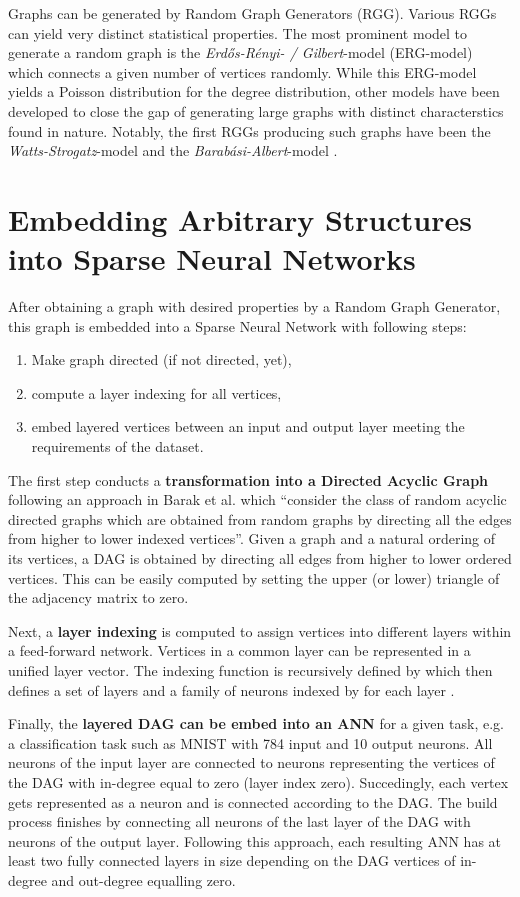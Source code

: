 \documentclass[runningheads]{llncs}
\begin{document}
Graphs can be generated by Random Graph Generators (RGG).
Various RGGs can yield very distinct statistical properties.
The most prominent model to generate a random graph is the \textit{Erdős-Rényi- / Gilbert}-model (ERG-model) which connects a given number of vertices randomly. While this ERG-model yields a Poisson distribution for the degree distribution, other models have been developed to close the gap of generating large graphs with distinct characterstics found in nature.
Notably, the first RGGs producing such graphs have been the \textit{Watts-Strogatz}-model \cite{watts1998collective} and the \textit{Barabási-Albert}-model \cite{albert2002statistical}.



\section{Embedding Arbitrary Structures into Sparse Neural Networks}
After obtaining a graph with desired properties by a Random Graph Generator, this graph is embedded into a Sparse Neural Network with following steps:
\begin{enumerate}
	\item Make graph directed (if not directed, yet),
	\item compute a layer indexing for all vertices,
	\item embed layered vertices between an input and output layer meeting the requirements of the dataset.
\end{enumerate}

\noindent The first step conducts a \textbf{transformation into a Directed Acyclic Graph} following an approach in Barak et al. \cite{barak1984maximal} which ``consider the class  of random acyclic directed graphs which are obtained from random graphs by directing all the edges from higher to lower indexed vertices''.
Given a graph and a natural ordering of its vertices, a DAG is obtained by directing all edges from higher to lower ordered vertices.
This can be easily computed by setting the upper (or lower) triangle of the adjacency matrix to zero.

\noindent Next, a \textbf{layer indexing} is computed to assign vertices into different layers within a feed-forward network.
Vertices in a common layer can be represented in a unified layer vector.
The indexing function  is recursively defined by  which then defines a set of layers  and a family of neurons indexed by  for each layer .

\noindent Finally, the \textbf{layered DAG can be embed into an ANN} for a given task, e.g. a classification task such as MNIST with 784 input and 10 output neurons.
All neurons of the input layer are connected to neurons representing the vertices of the DAG with in-degree equal to zero (layer index zero).
Succedingly, each vertex gets represented as a neuron and is connected according to the DAG.
The build process finishes by connecting all neurons of the last layer of the DAG with neurons of the output layer.
Following this approach, each resulting ANN has at least two fully connected layers in size depending on the DAG vertices of in-degree and out-degree equalling zero.
\end{document}
